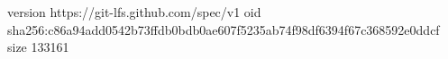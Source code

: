 version https://git-lfs.github.com/spec/v1
oid sha256:c86a94add0542b73ffdb0bdb0ae607f5235ab74f98df6394f67c368592e0ddcf
size 133161
